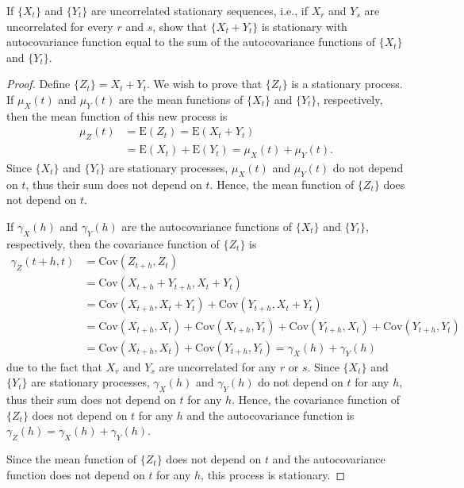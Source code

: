 \documentclass[12pt]{article}
\theoremstyle{definition}
\newenvironment{custompbm}[1]
  {\renewcommand\theproblem{#1}\problem}
  {\endproblem}
\newcommand{\E}{\text{E}}
\newcommand{\Co}[2]{\text{Cov}({#1}, {#2})}
\begin{document}
\begin{custompbm}{1.7}
  If $\{ X_t \}$ and $\{ Y_t \}$ are uncorrelated stationary sequences, i.e.,
  if $X_r$ and $Y_s$ are uncorrelated for every $r$ and $s$, show that
  $\{ X_t + Y_t \}$ is stationary with autocovariance function equal to the sum
  of the autocovariance functions of $\{ X_t \}$ and $\{ Y_t \}$.
\end{custompbm}

\begin{proof}
  Define $\{Z_t\} = {X_t} + {Y_t}$. We wish to prove that $\{Z_t\}$ is a
  stationary process.   If $\mu_X(t)$ and $\mu_Y(t)$ are the mean functions of $\{ X_t \}$ and $\{ Y_t \}$,
  respectively, then the mean function of this new process is
  \begin{align*}
    \mu_Z(t) &= \E(Z_t) = \E(X_t + Y_t) \\
    &= \E(X_t) + \E(Y_t) = \mu_X(t) + \mu_Y(t).
  \end{align*}
  Since $\{ X_t \}$ and $\{ Y_t \}$ are stationary processes, $\mu_X(t)$ and $\mu_Y(t)$ do
  not depend on $t$, thus their sum does not depend on $t$. Hence, the mean
  function of $\{Z_t\}$ does not depend on $t$.

  If $\gamma_X(h)$ and $\gamma_Y(h)$ are the autocovariance functions of $\{ X_t \}$ and $\{ Y_t \}$,
  respectively, then the covariance function of $\{ Z_t \}$ is
  \begin{align*}
    \gamma_Z(t+h, t) &= \Co{Z_{t+h}}{Z_t} \\
    &= \Co{X_{t+h} + Y_{t+h}}{X_{t} + Y_{t}} \\
    &= \Co{X_{t+h}}{X_{t} + Y_{t}} + \Co{Y_{t+h}}{X_{t} + Y_{t}} \\
    &= \Co{X_{t+h}}{X_t} + \Co{X_{t+h}}{Y_t} + \Co{Y_{t+h}}{X_t} + \Co{Y_{t+h}}{Y_t} \\
    &= \Co{X_{t+h}}{X_t} + \Co{Y_{t+h}}{Y_t} = \gamma_X(h) + \gamma_Y(h)
  \end{align*}
  due to the fact that $X_r$ and $Y_s$ are uncorrelated for any $r$ or $s$. Since
  $\{ X_t \}$ and $\{ Y_t \}$ are stationary processes, $\gamma_X(h)$ and $\gamma_Y(h)$ do
  not depend on $t$ for any $h$, thus their sum does not depend on $t$ for any $h$. Hence, the covariance
  function of $\{Z_t\}$ does not depend on $t$ for any $h$ and the autocovariance
  function is $\gamma_Z(h) = \gamma_X(h) + \gamma_Y(h)$.

  Since the mean function of $\{Z_t\}$ does not depend on $t$ and the autocovariance
  function does not depend on $t$ for any $h$, this process is stationary.
\end{proof}
\end{document}
